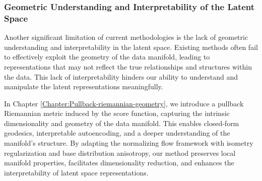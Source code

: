\subsubsection{Geometric Understanding and Interpretability of the Latent Space}

Another significant limitation of current methodologies is the lack of geometric understanding and interpretability in the latent space. Existing methods often fail to effectively exploit the geometry of the data manifold, leading to representations that may not reflect the true relationships and structures within the data. This lack of interpretability hinders our ability to understand and manipulate the latent representations meaningfully.


In Chapter \ref{Chapter:Pullback-riemannian-geometry}, we introduce a pullback Riemannian metric induced by the score function, capturing the intrinsic dimensionality and geometry of the data manifold. This enables closed-form geodesics, interpretable autoencoding, and a deeper understanding of the manifold's structure. By adapting the normalizing flow framework with isometry regularization and base distribution anisotropy, our method preserves local manifold properties, facilitates dimensionality reduction, and enhances the interpretability of latent space representations.
